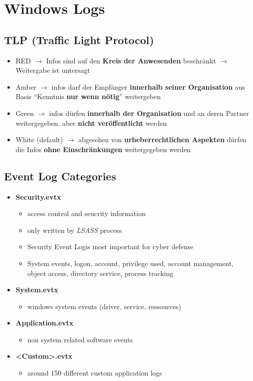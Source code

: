 

\section{Windows Logs}

\subsection{TLP (Traffic Light Protocol)}
\begin{itemize}
    \item RED $\rightarrow$ Infos sind auf den \textbf{Kreis der Anwesenden} beschränkt $\rightarrow$ Weitergabe ist untersagt
    \item Amber $\rightarrow$ infos darf der Empfänger \textbf{innerhalb seiner Organisation} aus Basis “Kenntnis \textbf{nur wenn nötig}” weitergeben
    \item Green $\rightarrow$ infos dürfen \textbf{innerhalb der Organisation} und an deren Partner weitergegeben, aber \textbf{nicht veröffentlicht} werden
    \item White (default) $\rightarrow$ abgesehen von \textbf{urheberrechtlichen Aspekten} dürfen die Infos \textbf{ohne Einschränkungen} weitergegeben werden
\end{itemize}

\subsection{Event Log Categories}
\begin{itemize}
    \item \textbf{Security.evtx}
    \begin{itemize}
        \item access control and seucrity information
        \item only written by \textit{LSASS} process
        \item \glqq Security Event Log\grqq is most important for cyber defense
        \item System events, logon, account, privilege used, account management, object access, directory service, process tracking
    \end{itemize}
    \item \textbf{System.evtx}
    \begin{itemize}
        \item windows system events (driver, service, ressources)
    \end{itemize}
    \item \textbf{Application.evtx}
    \begin{itemize}
        \item non system related software events
    \end{itemize}
    \item \textbf{<Custom>.evtx}
    \begin{itemize}
        \item around 150 different custom application logs
    \end{itemize}
\end{itemize}

